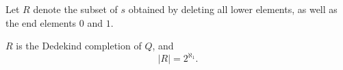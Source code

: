 Let $R$ denote the subset of $s$ obtained by deleting all lower elements, as well as the end elements $0$ and $1$.

$R$ is the Dedekind completion of $Q$, and
$$|R| = 2^{\aleph_1}.$$
